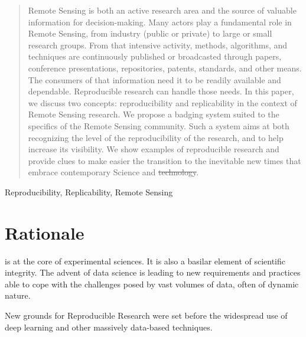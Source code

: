 \documentclass[journal,twoside]{IEEEtran}
\providecommand{\DIFadd}[1]{{\protect\color{blue}\uwave{#1}}} %
\providecommand{\DIFdel}[1]{{\protect\color{red}\sout{#1}}}                      %
\providecommand{\DIFaddbegin}{} %
\providecommand{\DIFaddend}{} %
\providecommand{\DIFdelbegin}{} %
\providecommand{\DIFdelend}{} %
\newcommand{\DIFscaledelfig}{0.5}
\newlength{\DIFdelgraphicswidth} %
\newlength{\DIFdelgraphicsheight} %
\newcommand{\DIFaddincludegraphics}[2][]{{\color{blue}\fbox{\DIFOincludegraphics[#1]{#2}}}} %
\newcommand{\DIFdelincludegraphics}[2][]{%
\sbox{\DIFdelgraphicsbox}{\DIFOincludegraphics[#1]{#2}}%
\settoboxwidth{\DIFdelgraphicswidth}{\DIFdelgraphicsbox} %
\settoboxtotalheight{\DIFdelgraphicsheight}{\DIFdelgraphicsbox} %
\scalebox{\DIFscaledelfig}{%
\parbox[b]{\DIFdelgraphicswidth}{\usebox{\DIFdelgraphicsbox}\\[-\baselineskip] \rule{\DIFdelgraphicswidth}{0em}}\llap{\resizebox{\DIFdelgraphicswidth}{\DIFdelgraphicsheight}{%
\setlength{\unitlength}{\DIFdelgraphicswidth}%
\begin{picture}(1,1)%
\thicklines\linethickness{2pt} %
{\color[rgb]{1,0,0}\put(0,0){\framebox(1,1){}}}%
{\color[rgb]{1,0,0}\put(0,0){\line( 1,1){1}}}%
{\color[rgb]{1,0,0}\put(0,1){\line(1,-1){1}}}%
\end{picture}%
}\hspace*{3pt}}} %
} %
\DeclareRobustCommand{\DIFaddbegin}{\DIFOaddbegin \let\includegraphics\DIFaddincludegraphics} %
\DeclareRobustCommand{\DIFaddend}{\DIFOaddend \let\includegraphics\DIFOincludegraphics} %
\DeclareRobustCommand{\DIFdelbegin}{\DIFOdelbegin \let\includegraphics\DIFdelincludegraphics} %
\DeclareRobustCommand{\DIFdelend}{\DIFOaddend \let\includegraphics\DIFOincludegraphics} %
\begin{document}
\maketitle
\begin{abstract}
	Remote Sensing is both an active research area and the source of valuable information for decision-making.
	Many actors play a fundamental role in Remote Sensing, from industry (public or private) to large or small research groups. 
	From that intensive activity, methods, algorithms, and techniques are continuously published or broadcasted through papers, conference presentations, repositories, patents, standards, and other means.     
	The consumers of that information need it to be readily available and dependable. 
	Reproducible research can handle those needs.
	In this paper, we discuss two concepts: reproducibility and replicability in the context of Remote Sensing research. 
	We propose a badging system suited to the specifics of the Remote Sensing community.
	Such a system aims at both recognizing the level of the reproducibility of the research, and to help increase its visibility.
	We show examples of reproducible research and provide clues to make easier the transition to the inevitable new times that embrace contemporary Science and \DIFdelbegin \DIFdel{technology}\DIFdelend \DIFaddbegin \DIFadd{Technology}\DIFaddend . 
\end{abstract}

\begin{IEEEkeywords}
	Reproducibility,
	Replicability,
	Remote Sensing
\end{IEEEkeywords}


\IEEEpeerreviewmaketitle

\section{Rationale}\label{Sec:Introduction}

 is at the core of experimental sciences. 
It is also a basilar element of scientific integrity. 
The advent of data science is leading to new requirements and practices able to cope with the challenges posed by vast volumes of data, often of dynamic nature. 

New grounds for Reproducible Research were set before the widespread use of deep learning and other massively data-based techniques.
\end{document}
